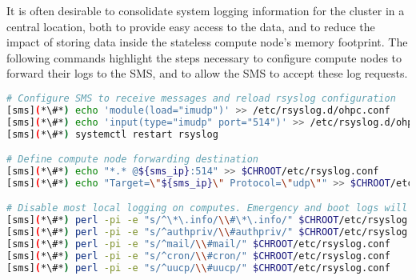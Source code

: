 It is often desirable to consolidate system logging information for the cluster in a
central location, both to provide easy access to the data, and to reduce the
impact of storing data inside the stateless compute node's memory footprint. The
following commands highlight the steps necessary to configure compute nodes to
forward their logs to the SMS, and to allow the SMS to accept these log requests.


\begin{lstlisting}[language=bash,keywords={}]
# Configure SMS to receive messages and reload rsyslog configuration
[sms](*\#*) echo 'module(load="imudp")' >> /etc/rsyslog.d/ohpc.conf
[sms](*\#*) echo 'input(type="imudp" port="514")' >> /etc/rsyslog.d/ohpc.conf
[sms](*\#*) systemctl restart rsyslog

# Define compute node forwarding destination
[sms](*\#*) echo "*.* @${sms_ip}:514" >> $CHROOT/etc/rsyslog.conf
[sms](*\#*) echo "Target=\"${sms_ip}\" Protocol=\"udp\"" >> $CHROOT/etc/rsyslog.conf

# Disable most local logging on computes. Emergency and boot logs will remain on the compute nodes
[sms](*\#*) perl -pi -e "s/^\*\.info/\\#\*\.info/" $CHROOT/etc/rsyslog.conf
[sms](*\#*) perl -pi -e "s/^authpriv/\\#authpriv/" $CHROOT/etc/rsyslog.conf
[sms](*\#*) perl -pi -e "s/^mail/\\#mail/" $CHROOT/etc/rsyslog.conf
[sms](*\#*) perl -pi -e "s/^cron/\\#cron/" $CHROOT/etc/rsyslog.conf
[sms](*\#*) perl -pi -e "s/^uucp/\\#uucp/" $CHROOT/etc/rsyslog.conf

\end{lstlisting}
